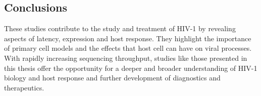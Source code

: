 \documentclass[../sherrill-Mix_thesis.tex]{subfiles}
\begin{document}
\subsection{Conclusions}
	These studies contribute to the study and treatment of HIV-1 by revealing aspects of latency, expression and host response. They highlight the importance of primary cell models and the effects that host cell can have on viral processes. With rapidly increasing sequencing throughput, studies like those presented in this thesis offer the opportunity for a deeper and broader understanding of HIV-1 biology and host response and further development of diagnostics and therapeutics.
\end{document}
